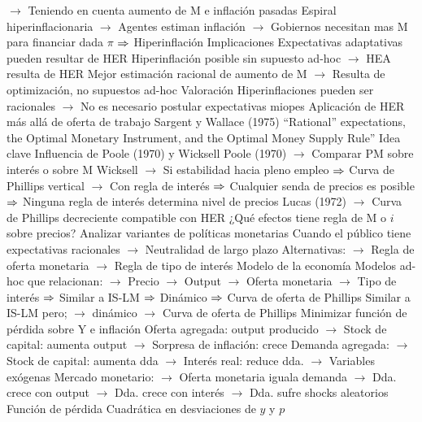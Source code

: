 \documentclass{nuevotema}
\begin{document}
\begin{esquemal}
				\4[] $\to$ Teniendo en cuenta aumento de M e inflación pasadas
				\4[] Espiral hiperinflacionaria
				\4[] $\to$ Agentes estiman inflación
				\4[] $\to$ Gobiernos necesitan mas M para financiar dada $\pi$
				\4[] $\Rightarrow$ Hiperinflación
				\4 Implicaciones
				\4[] Expectativas adaptativas pueden resultar de HER
				\4[] Hiperinflación posible sin supuesto ad-hoc
				\4[] $\to$ HEA resulta de HER
				\4[] Mejor estimación racional de aumento de M
				\4[] $\to$ Resulta de optimización, no supuestos ad-hoc
				\4 Valoración
				\4[] Hiperinflaciones pueden ser racionales
				\4[] $\to$ No es necesario postular expectativas miopes
				\4[] Aplicación de HER más allá de oferta de trabajo
			\3 Sargent y Wallace (1975)
				\4 ``Rational'' expectations, the Optimal Monetary Instrument, and the Optimal Money Supply Rule''
				\4 Idea clave
				\4[] Influencia de Poole (1970) y Wicksell
				\4[] Poole (1970)
				\4[] $\to$ Comparar PM sobre interés o sobre M
				\4[] Wicksell
				\4[] $\to$ Si estabilidad hacia pleno empleo
				\4[] $\Rightarrow$ Curva de Phillips vertical
				\4[] $\to$ Con regla de interés
				\4[] $\Rightarrow$ Cualquier senda de precios es posible
				\4[] $\Rightarrow$ Ninguna regla de interés determina nivel de precios
				\4[] Lucas (1972)
				\4[] $\to$ Curva de Phillips decreciente compatible con HER
				\4[] ¿Qué efectos tiene regla de M o $i$ sobre precios?
				\4[] Analizar variantes de políticas monetarias
				\4[] Cuando el público tiene expectativas racionales
				\4[] $\to$ Neutralidad de largo plazo
				\4[] Alternativas:
				\4[] $\to$ Regla de oferta monetaria
				\4[] $\to$ Regla de tipo de interés
				\4 Modelo de la economía
				\4[] Modelos ad-hoc que relacionan:
				\4[] $\to$ Precio
				\4[] $\to$ Output
				\4[] $\to$ Oferta monetaria
				\4[] $\to$ Tipo de interés
				\4[] $\Rightarrow$ Similar a IS-LM
				\4[] $\Rightarrow$ Dinámico
				\4[] $\Rightarrow$ Curva de oferta de Phillips
				\4[] Similar a IS-LM pero;
				\4[] $\to$ dinámico
				\4[] $\to$ Curva de oferta de Phillips
				\4[] Minimizar función de pérdida sobre Y e inflación
				\4[] Oferta agregada: output producido
				\4[] $\to$ Stock de capital: aumenta output
				\4[] $\to$ Sorpresa de inflación: crece
				\4[] Demanda agregada:
				\4[] $\to$ Stock de capital: aumenta dda
				\4[] $\to$ Interés real: reduce dda.
				\4[] $\to$ Variables exógenas
				\4[] Mercado monetario:
				\4[] $\to$ Oferta monetaria iguala demanda
				\4[] $\to$ Dda. crece con output
				\4[] $\to$ Dda. crece con interés
				\4[] $\to$ Dda. sufre shocks aleatorios
				\4 Función de pérdida
				\4[] Cuadrática en desviaciones de $y$ y $p$

\end{esquemal}
\end{document}
